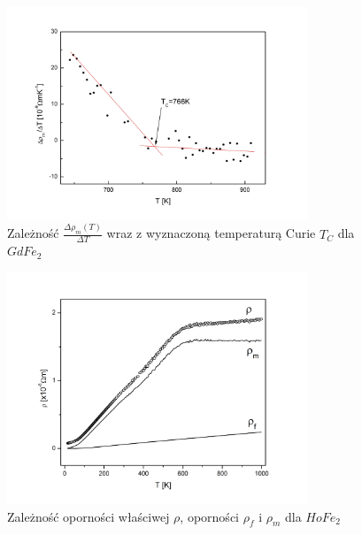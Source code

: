 \documentclass[a4paper,12pt]{article}
\numberwithin{equation}{section}
\begin{document}
\begin{figure}[ht]
    \centering
    \includegraphics[width =0.8\textwidth]{../img/opor/pochodnaGd}
    \caption{Zależność $\frac{\Delta\rho_m(T)}{\Delta T}$ wraz z wyznaczoną temperaturą Curie $T_C$ dla $GdFe_2$}
    \label{skladoweGd}
\end{figure}




\begin{figure}[ht]
    \centering
    \includegraphics[width =0.8\textwidth]{../img/opor/skladoweHo}
    \caption{Zależność oporności właściwej $\rho$, oporności $\rho_f$ i $\rho_m$ dla $HoFe_2$}
    \label{skladoweHo}
\end{figure}
\end{document}
